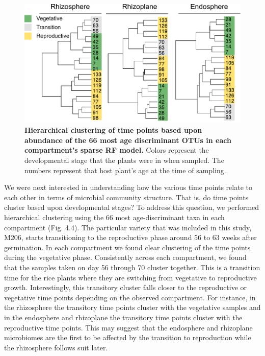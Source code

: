 \begin{figure}[h]
\centering
\includegraphics[width=5in]{Figures/rf_trees}
\caption[Figure 4.4]{\textbf{Hierarchical clustering of time points based upon abundance of the 66 most age discriminant OTUs in each compartment's sparse RF model.} Colors represent the developmental stage that the plants were in when sampled. The numbers represent that host plant's age at the time of sampling.}
\label{Figure 4.4}
\end{figure}

We were next interested in understanding how the various time points relate to each other in terms of microbial community structure. That is, do time points cluster based upon developmental stages? To address this question, we performed hierarchical clustering using the 66 most age-discriminant taxa in each compartment (Fig. 4.4). The particular variety that was included in this study, M206, starts transitioning to the reproductive phase around 56 to 63 weeks after germination. In each compartment we found clear clustering of the time points during the vegetative phase. Consistently across each compartment, we found that the samples taken on day 56 through 70 cluster together. This is a transition time for the rice plants where they are switching from vegetative to reproductive growth. Interestingly, this transitory cluster falls closer to the reproductive or vegetative time points depending on the observed compartment. For instance, in the rhizosphere the transitory time points cluster with the vegetative samples and in the endosphere and rhizoplane the transitory time points cluster with the reproductive time points. This may suggest that the endosphere and rhizoplane microbiomes are the first to be affected by the transition to reproduction while the rhizosphere follows suit later.	

